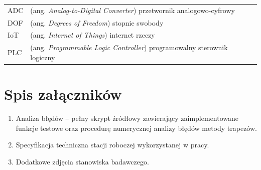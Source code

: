 \documentclass[11pt, a4paper, twoside]{report}
\begin{document}
\vspace{1cm} %

\begin{tabular}{ll} %
	ADC  & (ang. \textit{Analog-to-Digital Converter}) przetwornik analogowo-cyfrowy \\
	DOF  & (ang. \textit{Degrees of Freedom}) stopnie swobody \\
	IoT  & (ang. \textit{Internet of Things}) internet rzeczy \\
	PLC  & (ang. \textit{Programmable Logic Controller}) programowalny sterownik logiczny \\
\end{tabular}


\clearpage\thispagestyle{empty}\mbox{}\clearpage


\listoffigures   

\clearpage\thispagestyle{empty}\mbox{}\clearpage



\listoftables  

\clearpage\thispagestyle{empty}\mbox{}\clearpage



\chapter*{Spis załączników}

\begin{enumerate}
	\item Analiza błędów -- pełny skrypt źródłowy zawierający zaimplementowane funkcje testowe oraz procedurę numerycznej analizy błędów metody trapezów.
	
	\item Specyfikacja techniczna stacji roboczej wykorzystanej w pracy.
	
	\item Dodatkowe zdjęcia stanowiska badawczego.
	
\end{enumerate}
\end{document}
